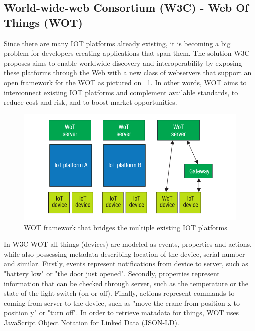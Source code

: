 \subsection{World-wide-web Consortium (W3C) - Web Of Things (WOT)}

Since there are many IOT platforms already existing, it is becoming a big problem for developers creating applications that span them. The solution W3C proposes aims to enable worldwide discovery and interoperability by exposing these platforms through the Web with a new class of webservers that support an open framework for the WOT as pictured on ~\ref{fig:WOTWebservers}. In other words, WOT aims to interconnect existing IOT platforms and complement available standards, to reduce cost and risk, and to boost market opportunities.

\begin{figure}[ht]
	\begin{center}
		\includegraphics[width=\textwidth]{images/WOTWebservers}
		\caption{WOT framework that bridges the multiple existing IOT platforms}
		\label{fig:WOTWebservers}
	\end{center}
\end{figure}

In W3C WOT all things (devices) are modeled as events, properties and actions, while also possessing metadata describing location of the device, serial number and similar. Firstly, events represent notifications from device to server, such as "battery low" or "the door just opened". Secondly, properties represent information that can be checked through server, such as the temperature or the state of the light switch (on or off). Finally, actions represent commands to coming from server to the device, such as "move the crane from position x to position y" or "turn off". In order to retrieve matadata for things, WOT uses JavaScript Object Notation for Linked Data (JSON-LD).

